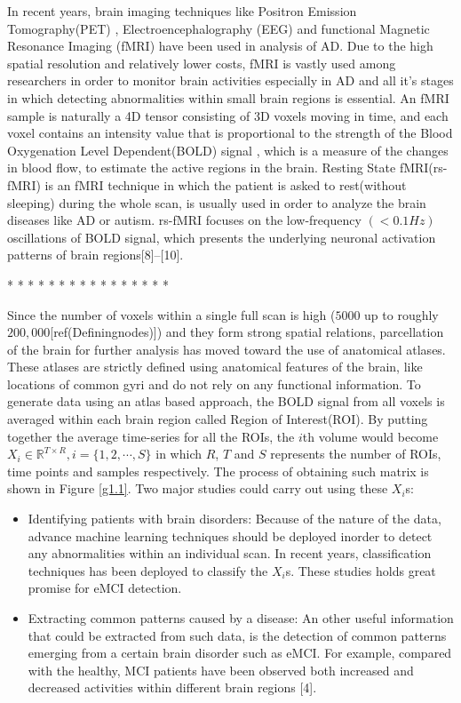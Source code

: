 \documentclass[journal]{IEEEtran}
\begin{document}
	
	In recent years, brain imaging techniques like Positron Emission Tomography(PET) \cite{r21}, Electroencephalography (EEG)\cite{r22} and functional Magnetic Resonance Imaging (fMRI)\cite{r23} have been used in analysis of AD. Due to the high spatial resolution and relatively lower costs, fMRI is vastly used among researchers in order to monitor brain activities especially in AD and all it's stages in which detecting abnormalities within small brain regions is essential. 
	An fMRI sample is naturally a 4D tensor consisting of 3D voxels moving in time, and each voxel contains an intensity value that is proportional to the strength of the Blood Oxygenation Level Dependent(BOLD) signal , which is a measure of the changes in blood flow, to estimate the active regions in the brain\cite{r07}.
	Resting State fMRI(rs-fMRI) is an fMRI technique in which the patient is asked to rest(without sleeping) during the whole scan, is usually used in order to analyze the brain diseases like AD or autism. rs-fMRI focuses on the low-frequency $\left( < 0.1 Hz \right)$  oscillations of BOLD signal, which presents the underlying neuronal activation patterns of brain regions[8]–[10]. 
	
{\color{red} * * * * * * * * * * * * * * * *}

Since the number of voxels within a single full scan is high 
($5000$ up to roughly $200,000$[ref(Definingnodes)]) and they form strong spatial relations, parcellation of the brain for further analysis has moved toward the use
of anatomical atlases. These atlases are strictly defined using
anatomical features of the brain, like locations of common gyri
and do not rely on any functional information. To generate data
using an atlas based approach, the BOLD signal from all voxels is averaged within each brain region called Region of Interest(ROI).
By putting together the average time-series for all the ROIs, the $i$th volume would become $X_i \in \mathbb{R}^{T \times R} , i = \{1,2,\cdots, S\}$ in which $R$, $T$ and $S$ represents the number of ROIs, time points and samples respectively. The process of obtaining such matrix is shown in Figure \eqref{g1.1}. 
Two major studies could carry out using these  $X_i$s: 
\begin{itemize}
	\item Identifying patients with brain disorders: Because of the nature of the data, advance machine learning techniques should be deployed inorder to detect any abnormalities within an individual scan. 
	In recent years, classification techniques has been deployed  to classify the $X_i$s. These studies holds great promise for eMCI detection.     
	\item Extracting common patterns caused by a disease: An other useful information that could be extracted from such data, is the detection of common patterns emerging from a certain brain disorder such as eMCI. For example, compared with the healthy,  MCI patients have been observed both increased and decreased activities within  different brain regions [4].
\end{itemize}
\end{document}
